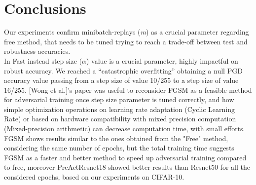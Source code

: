 \documentclass{article}
\begin{document}
\newpage
\section{Conclusions}
Our experiments confirm minibatch-replays (\textit{m}) as a crucial parameter regarding free method, that needs to be tuned trying to reach a trade-off between test and robustness accuracies.\\
In Fast instead step size ($\alpha$) value is a crucial parameter, highly impactful on robust accuracy. We reached a “catastrophic overfitting” obtaining a null PGD accuracy value passing from a step size of value 10/255 to a step size of value 16/255. 
[Wong et al.]'s paper \cite{WongEtAl2020} was useful to reconsider FGSM as a
feasible method for adversarial training once step size parameter is tuned
correctly, and how simple optimization operations on learning rate adaptation
(Cyclic Learning Rate) or based on hardware compatibility with mixed precision
computation (Mixed-precision arithmetic) can decrease computation time, with
small efforts. FGSM shows results similar to the ones obtained from the "Free"
method, considering the same number of epochs, but the total training time
suggests FGSM as a faster and better method to speed up adversarial training
compared to free, moreover PreActResnet18 showed better results than Resnet50 for all the considered epochs, based on our experiments on CIFAR-10.   
\end{document}
